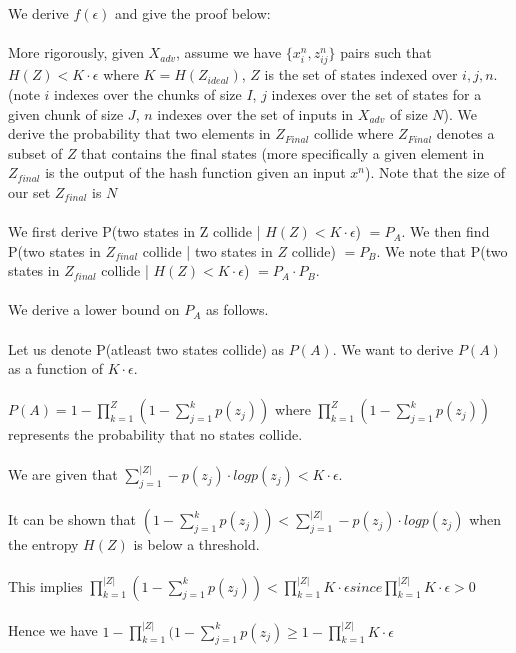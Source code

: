 \documentclass[letterpaper,twocolumn,10pt]{article}
\begin{document}
We derive $f(\epsilon)$ and give the proof below:
\\
\\
More rigorously, given $X_{adv}$, assume we have $\{x_{i}^{n}, z_{ij}^{n}\}$ pairs such that $H(Z) < K \cdot \epsilon$ where $K = H(Z_{ideal})$, $Z$ is the set of states indexed over $i, j, n$. (note $i$ indexes over the chunks of size $I$, $j$ indexes over the set of states for a given chunk of size $J$, $n$ indexes over the set of inputs in $X_{adv}$ of size $N$). We derive the probability that two elements in $Z_{Final}$ collide where $Z_{Final}$ denotes a subset of $Z$ that contains the final states (more specifically a given element in $Z_{final}$ is the output of the hash function given an input $x^{n}$). Note that the size of our set $Z_{final}$ is $N$ 
\\
\\
We first derive P(two states in Z collide | $H(Z) < K \cdot \epsilon$) $= P_{A}$. We then find P(two states in $Z_{final}$ collide | two states in $Z$ collide) $= P_{B}$. We note that P(two states in $Z_{final}$ collide |  $H(Z) < K \cdot \epsilon$) $=  P_{A} \cdot P_{B}$. 
\\
\\
We derive a lower bound on $P_{A}$ as follows.
\\
\\
Let us denote P(atleast two states collide) as $P(A)$. We want to derive $P(A)$ as a function of $K \cdot \epsilon$. 
\\
\\
$P(A) = 1 - \prod_{k=1}^{Z} (1- \sum_{j=1}^{k} p(z_{j}))$ where $\prod_{k=1}^{Z} (1- \sum_{j=1}^{k} p(z_{j}))$ represents the probability that no states collide. 
\\
\\
We are given that $\sum_{j=1}^{|Z|} -p(z_{j}) \cdot log p(z_{j}) < K \cdot \epsilon$. 
\\
\\
It can be shown that $(1 - \sum_{j=1}^{k} p(z_{j})) < \sum_{j=1}^{|Z|} -p(z_{j}) \cdot log p(z_{j})$ when the entropy $H(Z)$ is below a threshold.
\\
\\
This implies $ \prod_{k=1}^{|Z|} (1 - \sum_{j=1}^{k} p(z_{j})) < \prod_{k=1}^{|Z|} K \cdot \epsilon$$ since $$\prod_{k=1}^{|Z|} K \cdot \epsilon > 0$
\\
\\
Hence we have $ 1 - \prod_{k=1}^{|Z|} (1 - \sum_{j=1}^{k} p(z_{j}) \geq 1 - \prod_{k=1}^{|Z|} K \cdot \epsilon$
\\
\end{document}
